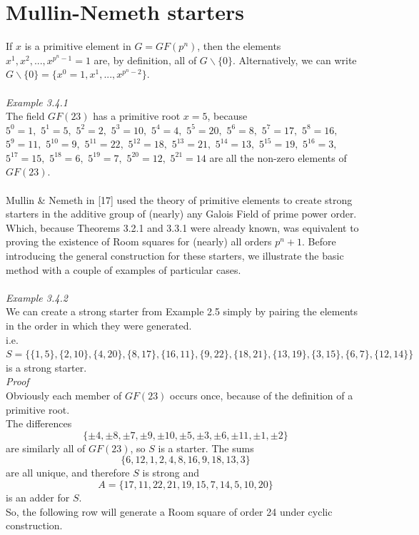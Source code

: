 \documentclass[
  12pt,
  a4paper]{book}
\begin{document}
\hypertarget{mullin-nemeth-starters}{%
\section{Mullin-Nemeth starters}\label{mullin-nemeth-starters}}

If \(x\) is a primitive element in \(G=GF(p^n)\), then the elements
\(x^1,x^2,...,x^{p^n-1}=1\) are, by definition, all of
\(G \backslash \{0\}\). Alternatively, we can write \(G \backslash \{0\}=\{x^0=1,x^1,..., x^{p^n-2}\}\).\\
~\\
\emph{Example 3.4.1}\\
The field \(GF(23)\) has a primitive root \(x=5\), because\\
\(5^0=1,\) \(5^1=5,\) \(5^2=2,\) \(5^3=10,\) \(5^4=4,\) \(5^5=20,\) \(5^6=8,\)
\(5^7=17,\) \(5^8=16,\) \(5^9=11,\) \(5^{10}=9,\) \(5^{11}=22,\) \(5^{12}=18,\)
\(5^{13}=21,\) \(5^{14}=13,\) \(5^{15}=19,\) \(5^{16}=3,\) \(5^{17}=15,\)
\(5^{18}=6,\) \(5^{19}=7,\) \(5^{20}=12,\) \(5^{21}=14\) are all the non-zero
elements of \(GF(23)\).\\
~\\
Mullin \& Nemeth in {[}17{]} used the theory of primitive elements to create
strong starters in the additive group of (nearly) any Galois Field of
prime power order. Which, because Theorems 3.2.1 and 3.3.1 were already
known, was equivalent to proving the existence of Room squares for
(nearly) all orders \(p^n+1\). Before introducing the general construction
for these starters, we illustrate the basic method with a couple of
examples of particular cases.\\
~\\
\emph{Example 3.4.2}\\
We can create a strong starter from Example 2.5 simply by pairing the
elements in the order in which they were generated.\\
i.e.
\(S=\{\{1,5\},\{2,10\},\{4,20\},\{8,17\},\{16,11\},\{9,22\},\{18,21\},\{13,19\},\{3,15\},\{6,7\},\{12,14\}\}\)\\
is a strong starter.\\
\emph{Proof}\\
Obviously each member of \(GF(23)\) occurs once, because of the definition
of a primitive root.\\
The differences
\[\{\pm 4, \pm 8, \pm 7, \pm 9, \pm 10, \pm 5, \pm 3, \pm 6, \pm 11, \pm 1, \pm 2\}\]
are similarly all of \(GF(23)\), so \(S\) is a starter. The sums
\[\{6,12,1,2,4,8,16,9,18,13,3\}\] are all unique, and therefore \(S\) is
strong and \[A=\{17,11,22,21,19,15,7,14,5,10,20\}\] is an adder for
\(S\).\\
So, the following row will generate a Room square of order 24 under
cyclic construction.
\end{document}
